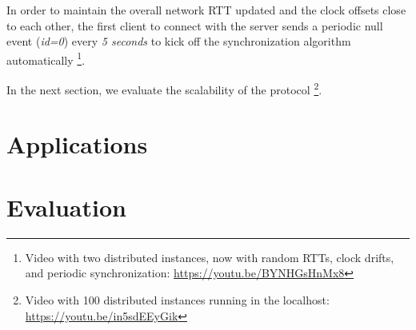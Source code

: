 \documentclass[sigplan,screen]{acmart}
\begin{document}
In order to maintain the overall network RTT updated and the clock offsets
close to each other, the first client to connect with the server sends a
periodic null event (\emph{id=0}) every \emph{5 seconds} to kick off the
synchronization algorithm automatically%
\footnote {
    Video with two distributed instances, now with random RTTs, clock drifts,
    and periodic synchronization:
    \url{https://youtu.be/BYNHGsHnMx8}
}.


In the next section, we evaluate the scalability of the protocol%
\footnote {
    Video with 100 distributed instances running in the localhost:
    \url{https://youtu.be/in5sdEEyGik}
}.

\section{Applications}
\label{sec.apps}

\section{Evaluation}
\label{sec.eval}

\end{document}
